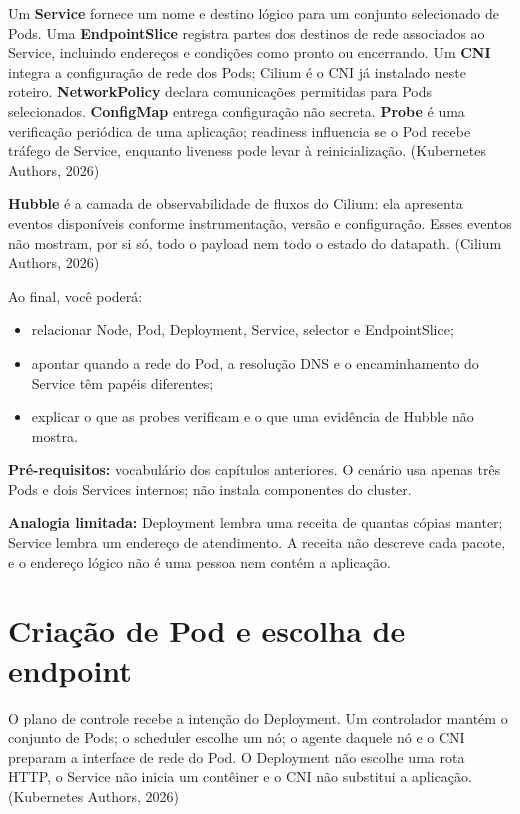 \documentclass[12pt,openany,oneside,a4paper,chapter=TITLE,english,brazil]{abntex2}
\providecommand{\tightlist}{\setlength{\itemsep}{0pt}\setlength{\parskip}{0pt}}
\begin{document}
Um \textbf{Service} fornece um nome e destino lógico para um conjunto selecionado de Pods. Uma \textbf{EndpointSlice} registra partes dos destinos de rede associados ao Service, incluindo endereços e condições como pronto ou encerrando. Um \textbf{CNI} integra a configuração de rede dos Pods; Cilium é o CNI já instalado neste roteiro. \textbf{NetworkPolicy} declara comunicações permitidas para Pods selecionados. \textbf{ConfigMap} entrega configuração não secreta. \textbf{Probe} é uma verificação periódica de uma aplicação; readiness influencia se o Pod recebe tráfego de Service, enquanto liveness pode levar à reinicialização. (Kubernetes Authors, 2026)

\textbf{Hubble} é a camada de observabilidade de fluxos do Cilium: ela apresenta eventos disponíveis conforme instrumentação, versão e configuração. Esses eventos não mostram, por si só, todo o payload nem todo o estado do datapath. (Cilium Authors, 2026)

Ao final, você poderá:

\begin{itemize}
\tightlist
\item
  relacionar Node, Pod, Deployment, Service, selector e EndpointSlice;
\item
  apontar quando a rede do Pod, a resolução DNS e o encaminhamento do Service têm papéis diferentes;
\item
  explicar o que as probes verificam e o que uma evidência de Hubble não mostra.
\end{itemize}

\textbf{Pré-requisitos:} vocabulário dos capítulos anteriores. O cenário usa apenas três Pods e dois Services internos; não instala componentes do cluster.

\textbf{Analogia limitada:} Deployment lembra uma receita de quantas cópias manter; Service lembra um endereço de atendimento. A receita não descreve cada pacote, e o endereço lógico não é uma pessoa nem contém a aplicação.

\section{Criação de Pod e escolha de endpoint}\label{criauxe7uxe3o-de-pod-e-escolha-de-endpoint}

O plano de controle recebe a intenção do Deployment. Um controlador mantém o conjunto de Pods; o scheduler escolhe um nó; o agente daquele nó e o CNI preparam a interface de rede do Pod. O Deployment não escolhe uma rota HTTP, o Service não inicia um contêiner e o CNI não substitui a aplicação. (Kubernetes Authors, 2026)
\end{document}
